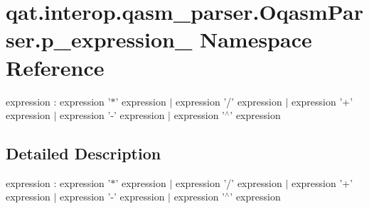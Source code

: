 \hypertarget{namespaceqat_1_1interop_1_1qasm__parser_1_1OqasmParser_1_1p__expression__0}{\section{qat.\-interop.\-qasm\-\_\-parser.\-Oqasm\-Parser.\-p\-\_\-expression\-\_ Namespace Reference}
\label{namespaceqat_1_1interop_1_1qasm__parser_1_1OqasmParser_1_1p__expression__0}
}


expression \-: expression '$\ast$' expression $|$ expression '/' expression $|$ expression '+' expression $|$ expression '-\/' expression $|$ expression '$^\wedge$' expression  




\subsection{Detailed Description}
expression \-: expression '$\ast$' expression $|$ expression '/' expression $|$ expression '+' expression $|$ expression '-\/' expression $|$ expression '$^\wedge$' expression 